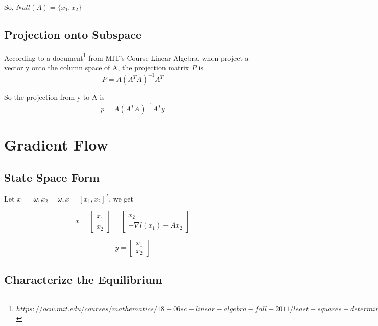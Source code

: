 \documentclass{article}
\begin{document}
So, $Null(A)=\{x_1,x_2\}$

\subsection{Projection onto Subspace}

According to a document\footnote{$https://ocw.mit.edu/courses/mathematics/
18-06sc-linear-algebra-fall-2011/least-squares-determinants-and-eigenvalues/
projections-onto-subspaces/MIT18\_06SCF11\_Ses2.2sum.pdf$}
from MIT's Course Linear Algebra, when project a vector y onto 
the column space of A, the projection matrix $P$ is
\begin{equation}
    P=A(A^TA)^{-1}A^T
\end{equation}

So the projection from y to A is
\begin{equation}
    p=A(A^TA)^{-1}A^Ty
\end{equation} 

\section{Gradient Flow}

\subsection{State Space Form}

Let $x_1=\omega, x_2=\dot{\omega}, x=[x_1,x_2]^T$, we get

\begin{equation}
    \dot{x}=
    \begin{bmatrix}
        \dot{x_1}\\\dot{x_2}
    \end{bmatrix}
    =\begin{bmatrix}
        x_2\\-\nabla l(x_1)-Ax_2
    \end{bmatrix}
\end{equation}

\begin{equation}
    y=
    \begin{bmatrix}
        x_1\\x_2
    \end{bmatrix}
\end{equation}

\subsection{Characterize the Equilibrium}
\end{document}
